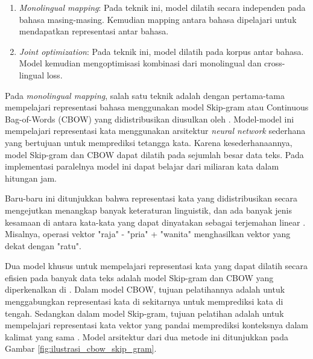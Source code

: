     \begin{enumerate}
        \item \textit{Monolingual mapping}: Pada teknik ini, model dilatih secara independen pada bahasa masing-masing. Kemudian mapping antara bahasa dipelajari untuk mendapatkan representasi antar bahasa.

        \item \textit{Joint optimization}: Pada teknik ini, model dilatih pada korpus antar bahasa. Model kemudian mengoptimisasi kombinasi dari monolingual dan cross-lingual loss.
    \end{enumerate}

    Pada \textit{monolingual mapping}, salah satu teknik adalah dengan pertama-tama mempelajari representasi bahasa menggunakan model Skip-gram atau Continuous Bag-of-Words (CBOW) yang didistribusikan diusulkan oleh \parencite{MikolovEstimation}. Model-model ini mempelajari representasi kata menggunakan arsitektur \textit{neural network} sederhana yang bertujuan untuk memprediksi tetangga kata. Karena kesederhanaannya, model Skip-gram dan CBOW dapat dilatih pada sejumlah besar data teks. Pada implementasi paralelnya model ini dapat belajar dari miliaran kata dalam hitungan jam.

    Baru-baru ini ditunjukkan bahwa representasi kata yang didistribusikan secara mengejutkan menangkap banyak keteraturan linguistik, dan ada banyak jenis kesamaan di antara kata-kata yang dapat dinyatakan sebagai terjemahan linear \parencite{MikolovLinguistic2013}. Misalnya, operasi vektor "raja" - "pria" + "wanita" menghasilkan vektor yang dekat dengan "ratu".

    Dua model khusus untuk mempelajari representasi kata yang dapat dilatih secara efisien pada banyak data teks adalah model Skip-gram dan CBOW yang diperkenalkan di \parencite{MikolovEstimation}. Dalam model CBOW, tujuan pelatihannya adalah untuk menggabungkan representasi kata di sekitarnya untuk memprediksi kata di tengah. Sedangkan dalam model Skip-gram, tujuan pelatihan adalah untuk mempelajari representasi kata vektor yang pandai memprediksi konteksnya dalam kalimat yang sama \parencite{MikolovEstimation}. Model arsitektur dari dua metode ini ditunjukkan pada Gambar \ref{fig:ilustrasi_cbow_skip_gram}.

